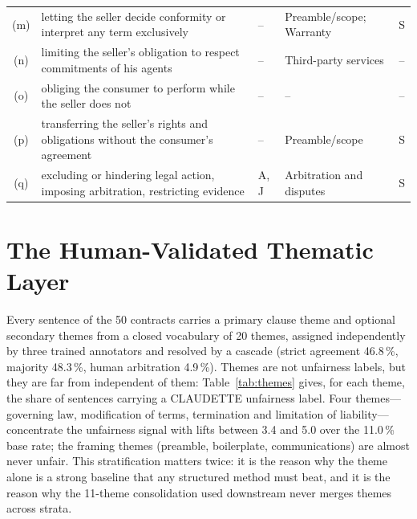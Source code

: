 \documentclass{IOS-Book-Article}
\newcommand{\corpus}{CLAUDETTE}
\begin{document}
\begin{table}[t]
\begin{tabular}{@{}c p{5.3cm} p{1.75cm} p{2.7cm} c@{}}
(m) & letting the seller decide conformity or interpret any term exclusively & -- & Preamble/scope; Warranty & S \\
(n) & limiting the seller's obligation to respect commitments of his agents & -- & Third-party services & -- \\
(o) & obliging the consumer to perform while the seller does not & -- & -- & -- \\
(p) & transferring the seller's rights and obligations without the consumer's agreement & -- & Preamble/scope & S \\
(q) & excluding or hindering legal action, imposing arbitration, restricting evidence & A, J & Arbitration and disputes & S \\
\bottomrule
\end{tabular}
\end{table}

\section{The Human-Validated Thematic Layer}
\label{sec:layer}
Every sentence of the 50 contracts carries a primary clause theme and optional secondary themes from a closed vocabulary of 20 themes, assigned independently by three trained annotators and resolved by a cascade (strict agreement 46.8\,\%, majority 48.3\,\%, human arbitration 4.9\,\%). Themes are not unfairness labels, but they are far from independent of them: Table~\ref{tab:themes} gives, for each theme, the share of sentences carrying a \corpus{} unfairness label. Four themes---governing law, modification of terms, termination and limitation of liability---concentrate the unfairness signal with lifts between 3.4 and 5.0 over the 11.0\,\% base rate; the framing themes (preamble, boilerplate, communications) are almost never unfair. This stratification matters twice: it is the reason why the theme alone is a strong baseline that any structured method must beat, and it is the reason why the 11-theme consolidation used downstream never merges themes across strata.
\end{document}
